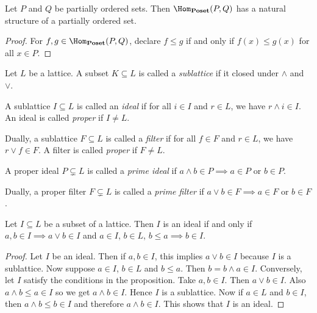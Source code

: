 \begin{proposition}
Let $P$ and $Q$ be partially ordered sets. Then $\Hom_{\mathbf{Poset}}(P,Q)$ has a natural structure of a partially ordered set.
\end{proposition}
\begin{proof}
For $f,g \in \Hom_{\mathbf{Poset}}(P,Q)$, declare $f \leq g$ if and only if $f(x) \leq g(x)$ for all $x \in P$.
\end{proof}

\begin{definition}
Let $L$ be a lattice. A subset $K \subseteq L$ is called a \emph{sublattice} if it closed under $\wedge$ and $\vee$.

A sublattice $I \subseteq L$ is called an \emph{ideal} if for all $i \in I$ and $r \in L$, we have $r \wedge i \in I$. An ideal is called \emph{proper} if $I \neq L$.

Dually, a sublattice $F \subseteq L$ is called a \emph{filter} if for all $f \in F$ and $r \in L$, we have $r \vee f \in F$. A filter is called \emph{proper} if $F \neq L$.

A proper ideal $P \subsetneq L$ is called a \emph{prime ideal} if $a \wedge b \in P \implies a \in P$ or $b \in P$.

Dually, a proper filter $F \subsetneq L$ is called a \emph{prime filter} if $a \vee b \in F \implies a \in F$ or $b \in F$.
\end{definition}

\begin{proposition} \label{prop:lattice ideals}
Let $I \subseteq L$ be a subset of a lattice. Then $I$ is an ideal if and only if $a,b \in I \implies a \vee b \in I$ and $a \in I$, $b \in L$, $b \leq a \implies b \in I$.
\end{proposition}
\begin{proof}
Let $I$ be an ideal. 
Then if $a,b \in I$, this implies $a \vee b \in I$ because $I$ is a sublattice.
Now suppose $a \in I$, $b \in L$ and $b \leq a$. 
Then $b = b \wedge a \in I$. 
Conversely, let $I$ satisfy the conditions in the proposition.
Take $a,b \in I$. 
Then $a \vee b \in I$. 
Also $a \wedge b \leq a \in I$ so we get $a \wedge b \in I$. 
Hence $I$ is a sublattice. 
Now if $a \in L$ and $b \in I$, then $a \wedge b \leq b \in I$ and therefore $a \wedge b \in I$. 
This shows that $I$ is an ideal. 
\end{proof}

